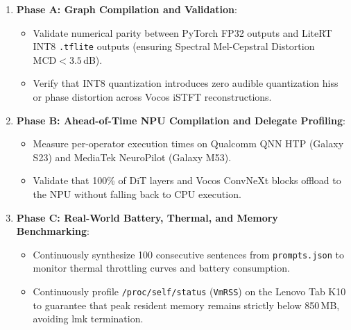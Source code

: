 \begin{enumerate}
    \item \textbf{Phase A: Graph Compilation and Validation}:
    \begin{itemize}
        \item Validate numerical parity between PyTorch FP32 outputs and LiteRT INT8 \texttt{.tflite} outputs (ensuring Spectral Mel-Cepstral Distortion $\text{MCD} < 3.5$\,dB).
        \item Verify that INT8 quantization introduces zero audible quantization hiss or phase distortion across Vocos iSTFT reconstructions.
    \end{itemize}
    
    \item \textbf{Phase B: Ahead-of-Time NPU Compilation and Delegate Profiling}:
    \begin{itemize}
        \item Measure per-operator execution times on Qualcomm QNN HTP (Galaxy S23) and MediaTek NeuroPilot (Galaxy M53).
        \item Validate that 100\% of DiT layers and Vocos ConvNeXt blocks offload to the NPU without falling back to CPU execution.
    \end{itemize}
    
    \item \textbf{Phase C: Real-World Battery, Thermal, and Memory Benchmarking}:
    \begin{itemize}
        \item Continuously synthesize 100 consecutive sentences from \texttt{prompts.json} to monitor thermal throttling curves and battery consumption.
        \item Continuously profile \texttt{/proc/self/status} (\texttt{VmRSS}) on the Lenovo Tab K10 to guarantee that peak resident memory remains strictly below 850\,MB, avoiding \gls{lmk} termination.
    \end{itemize}
\end{enumerate}
